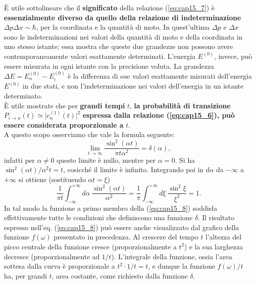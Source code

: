 È utile sottolineare che il \textbf{significato} della relazione (\ref{eq:cap15_7}) è \textbf{essenzialmente diverso da quello della relazione di indeterminazione} $\Delta p \Delta x\sim \hbar$, per la coordinata e la quantità di moto. In quest'ultima $\Delta p$ e $\Delta x$ sono le indeterminazioni nei valori della quantità di moto e della coordinata in uno stesso istante;  essa mostra che queste due grandezze non possono avere contemporaneamente valori esattamente determinati. L'energia $E ^{(0)}$, invece, può essere misurata in ogni istante con la precisione voluta. La grandezza $\Delta E = E_n ^{(0)} - E_i ^{(0)}$ è la differenza di sue valori esattamente misurati dell'energia $E^{(0)}$ in due stati, e non l'indeterminazione nei valori dell'energia in un istante determinato.\\
È utile mostrate che per \textbf{grandi tempi} $t$, \textbf{la probabilità di transizione} $P_{i\rightarrow n} (t) \simeq \vert c_n ^{(1)} (t) \vert ^2$ \textbf{espressa dalla relazione (\ref{eq:cap15_6}), può essere considerata proporzionale a } $t$.\\
A questo scopo osserviamo che vale la formula seguente:
\begin{equation}
\lim _{t \rightarrow \infty} \frac{\sin ^2 (\alpha t)}{\pi t \alpha ^2} = \delta (\alpha),
\label{eq:cap15_8}
\end{equation}
infatti per $\alpha \neq 0$ questo limite è nullo, mentre per  $\alpha = 0$. Si ha $\sin ^2 (\alpha t)/\alpha ^2 t = t$, cosicché il limite è infinito. Integrando poi in $d \alpha$ da $-\infty$ a $+\infty$ si ottiene (sostituendo $\alpha t = \xi$)
\begin{equation}
\frac{1}{\pi t}\int _{-\infty} ^{+\infty} d\alpha \ \frac{\sin ^2 (\alpha t)}{ \alpha ^2} = \frac{1}{\pi}\int _{-\infty} ^{+\infty} d\xi \ \frac{\sin ^2 \xi}{ \xi ^2}=1. 
\end{equation}
In tal modo la funzione a primo membro della (\ref{eq:cap15_8}) soddisfa effettivamente tutte le condizioni che definiscono una funzione $\delta$. Il risultato espresso nell'eq. (\ref{eq:cap15_8}) può essere anche visualizzato dal grafico della funzione $f(\omega)$ presentato in precedenza. Al crescere del tempo $t$ l'altezza del picco centrale della funzione cresce (proporzionalmente a $t^2$) e la sua larghezza decresce (proporzionalmente ad $1/t$). L'integrale della funzione, ossia l'area sottesa dalla curva è proporzionale a $t^2\cdot 1/t =t$, e dunque la funzione $f(\omega)/t$ ha, per grandi $t$, area costante, come richiesto dalla funzione $\delta$.\\
